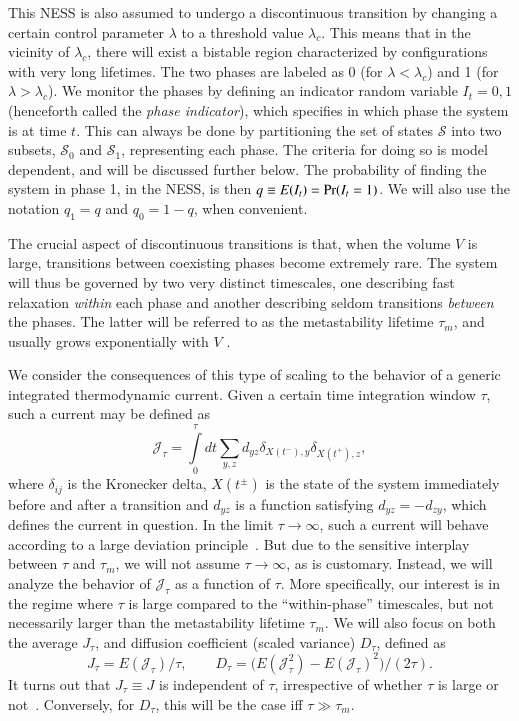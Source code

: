 \documentclass[aps,pre,reprint, amsmath, amssymb,superscriptaddress]{revtex4-1}
\begin{document}
This NESS is also assumed to undergo a discontinuous transition by changing a certain control parameter $\lambda$ to a threshold value $\lambda_c$.
This means that in the vicinity of $\lambda_c$, there will exist a bistable region characterized by configurations with very long lifetimes.
The two phases are labeled as 0 (for $\lambda <  \lambda_c$) and 1 (for $\lambda > \lambda_c$). 
We monitor the phases by defining an indicator random variable $I_t = 0,1$ (henceforth called the \emph{phase indicator}), which specifies in which phase the system is at time $t$.
This can always be done by partitioning the set  of states $\mathcal{S}$ into two subsets, $\mathcal{S}_0$ and $\mathcal{S}_1$, representing each phase. 
The criteria for doing so is model dependent, and will be discussed further below. 
The probability of finding the system in phase 1, in the NESS, is then 
$q \equiv E(I_t) =  {\rm Pr}(I_t = 1)$.
We will also use the notation $q_1 = q$ and $q_0 = 1-q$, when convenient. 

The crucial aspect of discontinuous transitions is that, when the volume $V$ is large, transitions between coexisting phases become extremely rare. 
The system will thus be governed by two very distinct timescales, one describing fast relaxation \emph{within} each phase and another describing seldom transitions \emph{between} the phases.
The latter will be referred to as the metastability lifetime $\tau_m$, and usually grows exponentially with $V$ \cite{hanggi1984bistable}. 

We consider the consequences of this type of scaling to the behavior of a generic integrated thermodynamic current.
Given a certain time integration window $\tau$, such a current may be defined as~\cite{Gingrich2016}
\begin{equation}\label{current}
    \mathcal{J}_\tau = \int\limits_0^\tau dt \sum\limits_{y,z} d_{yz}  \delta_{X(t^-),y} \delta_{X(t^+),z},
\end{equation}
where $\delta_{ij}$ is the Kronecker delta, $X(t^{\pm})$ is the state of the system immediately before and after a transition and $d_{yz}$ is a function satisfying $d_{yz} = - d_{zy}$, which defines the current in question. 
In the limit $\tau\to \infty$, such a current will  behave according to a large deviation principle~\cite{Touchette2009}. 
But due to the sensitive interplay between $\tau$ and $\tau_m$, we will not assume $\tau\to \infty$, as is customary. 
Instead, we will analyze the behavior of $\mathcal{J}_\tau$ as a function of $\tau$. 
More specifically, our interest is in the regime where $\tau$ is large compared to the ``within-phase'' timescales, but not necessarily larger than the metastability lifetime $\tau_m$.
We will also focus on both the average  $J_\tau$, and diffusion coefficient (scaled variance) $D_\tau$, defined as
\begin{equation}\label{unconditional_quantities}
        J_\tau = E(\mathcal{J}_\tau)/\tau,
        \qquad 
        D_\tau = \Big(E(\mathcal{J}_\tau^2) - E(\mathcal{J}_\tau)^2\Big)/(2\tau).
\end{equation}
It turns out that $J_\tau \equiv J$ is  independent of $\tau$, irrespective of whether $\tau$ is large or not~\cite{Touchette2009}. 
Conversely, for $D_\tau$, this will be the case iff $\tau \gg \tau_m$.
\end{document}
